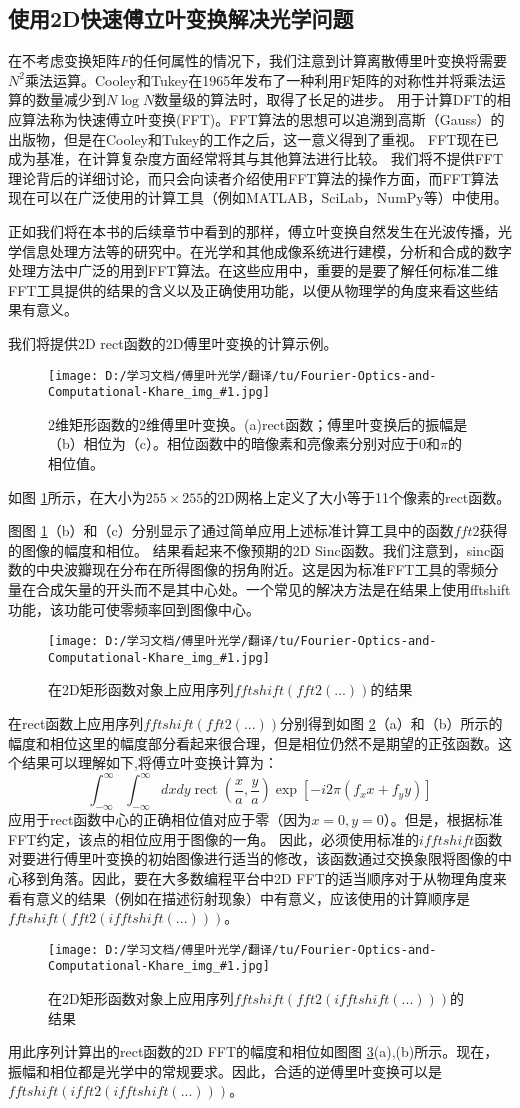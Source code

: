 \documentclass[10pt, UTF8]{ctexart}%
\numberwithin{equation}{section}
\numberwithin{figure}{section}
\newcommand {\InsertPic}[3]{\begin{figure}[htbp]\centering \texttt{[image: D:/学习文档/傅里叶光学/翻译/tu/Fourier-Optics-and-Computational-Khare\_img\_\#1.jpg]}\caption{#3}  \label{#2}\end{figure}}%
\def\Emphasize#1{\textcolor[rgb]{1,0,0}{#1}}
\newcommand{\InsertEqution}[2]{\begin{equation}
  \label{#1}
   #2
 \end{equation}}
\newcommand{\InsertInlineEq}[1]{$#1$}
\newcommand{\RefFig}[1]{图 \ref{#1}}
\begin{document}
\begin{sloppypar}
\subsection{使用2D快速傅立叶变换解决光学问题}
在不考虑变换矩阵\InsertInlineEq{F}的任何属性的情况下，我们注意到计算离散傅里叶变换将需要\InsertInlineEq{N^2}乘法运算。Cooley和Tukey在1965年发布了一种利用F矩阵的对称性并将乘法运算的数量减少到\InsertInlineEq{N\log N}数量级的算法时，取得了长足的进步。
  用于计算DFT的相应算法称为快速傅立叶变换(FFT)。FFT算法的思想可以追溯到高斯（Gauss）的出版物，但是在Cooley和Tukey的工作之后，这一意义得到了重视。 FFT现在已成为基准，在计算复杂度方面经常将其与其他算法进行比较。 我们将不提供FFT理论背后的详细讨论，而只会向读者介绍使用FFT算法的操作方面，而FFT算法现在可以在广泛使用的计算工具（例如MATLAB，SciLab，NumPy等）中使用。

  正如我们将在本书的后续章节中看到的那样，傅立叶变换自然发生在光波传播，光学信息处理方法等的研究中。在光学和其他成像系统进行建模，分析和合成的数字处理方法中广泛的用到FFT算法。在这些应用中，重要的是要了解任何标准二维FFT工具提供的结果的含义以及正确使用功能，以便从物理学的角度来看这些结果有意义。

  我们将提供2D rect函数的2D傅里叶变换的计算示例。\InsertPic{16}{F4.1}{2维矩形函数的2维傅里叶变换。(a)rect函数；傅里叶变换后的振幅是（b）相位为（c）。相位函数中的暗像素和亮像素分别对应于0和\InsertInlineEq{\pi}的相位值。}如\RefFig{F4.1}所示，在大小为\InsertInlineEq{255\times255}的2D网格上定义了大小等于11个像素的rect函数。

  图\RefFig{F4.1}（b）和（c）分别显示了通过简单应用上述标准计算工具中的函数\InsertInlineEq{fft2}获得的图像的幅度和相位。 结果看起来不像预期的2D Sinc函数。我们注意到，sinc函数的中央波瓣现在分布在所得图像的拐角附近。这是因为标准FFT工具的零频分量在合成矢量的开头而不是其中心处。一个常见的解决方法是在结果上使用fftshift功能，该功能可使零频率回到图像中心。\InsertPic{17}{F4.2}{在2D矩形函数对象上应用序列\InsertInlineEq{fftshift(fft2(...))}的结果}
  在rect函数上应用序列\InsertInlineEq{fftshift(fft2(...))}分别得到如\RefFig{F4.2}（a）和（b）所示的幅度和相位这里的幅度部分看起来很合理，但是相位仍然不是期望的正弦函数。这个结果可以理解如下,将傅立叶变换计算为：\InsertEqution{4.7}{\int_{-\infty}^{\infty} \int_{-\infty}^{\infty} d x d y \operatorname{rect}\left(\frac{x}{a}, \frac{y}{a}\right) \exp \left[-i 2 \pi\left(f_{x} x+f_{y} y\right)\right]}应用于rect函数中心的正确相位值对应于零（因为\InsertInlineEq{x=0,y=0}）。但是，根据标准FFT约定，该点的相位应用于图像的一角。 因此，必须使用标准的\InsertInlineEq{ifftshift}函数对要进行傅里叶变换的初始图像进行适当的修改，该函数通过交换象限将图像的中心移到角落。因此，要在大多数编程平台中2D FFT的适当顺序对于从物理角度来看有意义的结果（例如在描述衍射现象）中有意义，应该使用的计算顺序是\Emphasize{\InsertInlineEq{fftshift(fft2(ifftshift(...)))}}。
  \InsertPic{18}{F4.3}{在2D矩形函数对象上应用序列\InsertInlineEq{fftshift(fft2(ifftshift(...)))}的结果}
  用此序列计算出的rect函数的2D FFT的幅度和相位如图\RefFig{F4.3}(a),(b)所示。现在，振幅和相位都是光学中的常规要求。因此，合适的逆傅里叶变换可以是\Emphasize{\InsertInlineEq{fftshift(ifft2(ifftshift(...)))}}。


\end{sloppypar}
\end{document}
